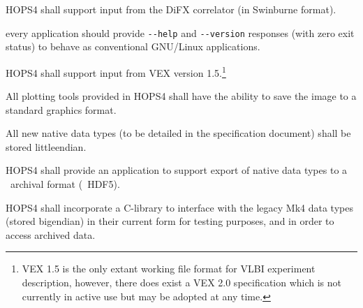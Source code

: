 \begin{description}

 HOPS4 shall support input from the DiFX \cite{deller2007difx,deller2011difx} correlator (in Swinburne format).

 every application should provide
    \verb+--help+ and \verb+--version+ responses (with zero exit status)
    to behave as conventional \acs{GNU/Linux} applications.

 HOPS4 shall support input from \acs{VEX} version 1.5.\footnote{\acs{VEX} 1.5
is the only extant working file format for VLBI experiment description, however, there does
exist a VEX 2.0 specification which is not currently in active use but may be adopted at any time.}


 All plotting tools provided in HOPS4 shall have the ability to save the image to
a standard graphics format.


 All new native data types (to be detailed in the specification document)
shall be stored \acs{littleendian}.

 HOPS4 shall provide an application to support export of native
data types to a \TBD~archival format (\eg~HDF5).

 HOPS4 shall incorporate a C-library to interface with the legacy
\acs{Mk4} data types (stored \acs{bigendian}) in their current form for
testing purposes, and in order to access archived data.

\end{description}



